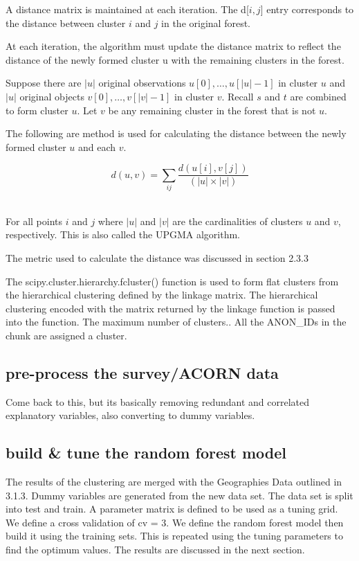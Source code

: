     A distance matrix is maintained at each iteration. The d[$i,j$] entry corresponds to the distance between cluster $i$ and $j$ in the original forest.

    At each iteration, the algorithm must update the distance matrix to reflect the distance of the newly formed cluster u with the remaining clusters in the forest.
    
    Suppose there are $|u|$ original observations $u[0],\dots, u[|u| -1]$ in cluster $u$ and $|u|$ original objects $v[0], \dots, v[|v| -1]$ in cluster $v$. Recall $s$ and $t$ are combined to form cluster $u$. Let $v$ be any remaining cluster in the forest that is not $u$.
    
    The following are method is used for calculating the distance between the newly formed cluster $u$ and each $v$.
    
    \begin{equation}
d(u, v) = \sum_{ij} \frac{d(u[i], v[j])}{(|u| \times |v|)}
    \end{equation}\
    
    For all points $i$ and $j$ where $|u|$ and $|v|$ are the cardinalities of clusters $u$ and $v$, respectively. This is also called the UPGMA algorithm.
    
    The metric used to calculate the distance was discussed in section 2.3.3
    
    The scipy.cluster.hierarchy.fcluster() function is used to form flat clusters from the hierarchical clustering defined by the linkage matrix. The hierarchical clustering encoded with the matrix returned by the linkage function is passed into the function. The maximum number of clusters..
    All the ANON\_IDs in the chunk are assigned a cluster.
    
    \subsection{pre-process the survey/ACORN data}
    Come back to this, but its basically removing redundant and correlated explanatory variables, also converting to dummy variables.
    
    \subsection{build \& tune the random forest model}
    The results of the clustering are merged with the Geographies Data outlined in 3.1.3.
    Dummy variables are generated from the new data set.
    The data set is split into test and train.
    A parameter matrix is defined to be used as a tuning grid.
    We define a cross validation of cv = 3.
    We define the random forest model then build it using the training sets.
    This is repeated using the tuning parameters to find the optimum values.
    The results are discussed in the next section.